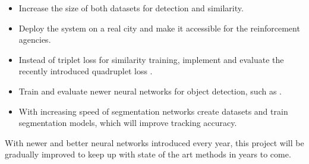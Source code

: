 \documentclass[a4paper,11pt,titlepage,twoside]{article}
\numberwithin{figure}{section}
\begin{document}
\begin{itemize}
\item Increase the size of both datasets for detection and similarity.
\item Deploy the system on a real city and make it accessible for the reinforcement agencies.
\item Instead of triplet loss for similarity training, implement and evaluate the recently introduced quadruplet loss \cite{chen2017beyond}.
\item Train and evaluate newer neural networks for object detection, such as \cite{lin2017focal, redmon2018yolov3}.
\item With increasing speed of segmentation networks create datasets and train segmentation models, which will improve tracking accuracy.
\end{itemize}

With newer and better neural networks introduced every year, this project will be gradually improved to keep up with state of the art methods in years to come.


\cleardoublepage

{}
\cleardoublepage
\clearpage



%
\end{document}
